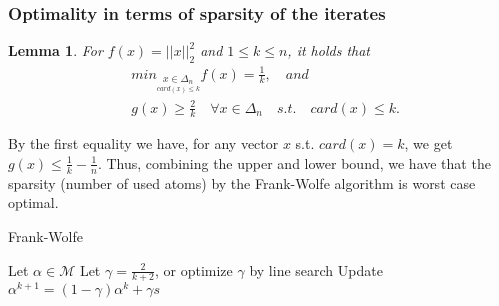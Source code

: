 \documentclass{article}
\newtheorem{lemma}{Lemma}
\begin{document}
\subsubsection{Optimality in terms of sparsity of the iterates}
\begin{lemma} \cite{Jaggi13}
For $f(x)= ||x||_{2}^{2}$ and $1\leq k\leq n$, it holds that
\begin{equation*}
\begin{aligned}
      &\textit{min}_{\underset{card(x)\leq
      k}{x\in\Delta_{n}}}f(x)= \frac{1}{k},\quad\textit{and}\\
      &g(x)\geq \frac{2}{k}\quad\forall x\in\Delta_{n}\quad\textit{s.t.}\quad card(x)\leq k. 
\end{aligned}    
\end{equation*}
\end{lemma}
By the first equality we have, for any vector $x$ s.t. $card(x)= k$, we get $g(x)\leq \frac{1}{k}- \frac{1}{n}$.
Thus, combining the upper and lower bound, we have that the sparsity (number of used atoms) by the Frank-Wolfe algorithm is worst case optimal.
\begin{algorithm}[tb]
   \caption{Frank-Wolfe}
   \label{alg:example}
\begin{algorithmic}
   \STATE Let $\alpha\in\mathcal{M}$
   \STATE Let $\gamma = \frac{2}{k+2}$, or optimize $\gamma$ by line search
   \STATE Update $\alpha^{k+1}= (1-\gamma)\alpha^{k}+ \gamma s$
   \ENDFOR
\end{algorithmic}
\end{algorithm}
\end{document}
